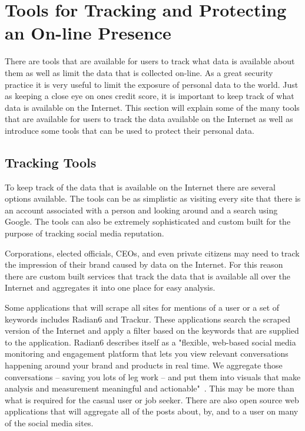 \section{Tools for Tracking and Protecting an On-line Presence} 
There are tools that are available for users to track what data is available
about them as well as limit the data that is collected on-line. As a great
security practice it is very useful to limit the exposure of personal data to
the world. Just as keeping a close eye on ones credit score, it is important to
keep track of what data is available on the Internet. This section will explain
some of the many tools that are available for users to track the data available
on the Internet as well as introduce some tools that can be used to protect
their personal data.%

\subsection{Tracking Tools} 
To keep track of the data that is available on the
Internet there are several options available. The tools can be as simplistic as
visiting every site that there is an account associated with a person and
looking around and a search using Google. The tools can also be extremely
sophisticated and custom built for the purpose of tracking social media
reputation. 

Corporations, elected officials, CEOs, and even private citizens may need to
track the impression of their brand caused by data on the Internet. For this
reason there are custom built services that track the data that is available all
over the Internet and aggregates it into one place for easy analysis. 

Some applications that will scrape all sites for mentions of a user or a set of
keywords includes Radian6 and Trackur. These applications search the scraped
version of the Internet and apply a filter based on the keywords that are
supplied to the application. Radian6 describes itself as a "flexible, web-based
social media monitoring and engagement platform that lets you view relevant
conversations happening around your brand and products in real time. We
aggregate those conversations – saving you lots of leg work – and put them into
visuals that make analysis and measurement meaningful and
actionable"~\cite{Radian6}. This may be more than what is required for the
casual user or job seeker.  There are also open source web applications that
will aggregate all of the posts about, by, and to a user on many of the social
media sites. 

